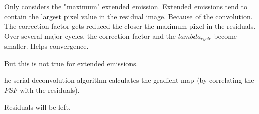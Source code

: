 Only considers the "maximum" extended emission. Extended emissions tend to contain the largest pixel value in the residual image. Because of the convolution.
The correction factor gets reduced the closer the maximum pixel in the residuals. Over several major cycles, the correction factor and the $lambda_{cycle}$ become smaller. 
Helps convergence.


But this is not true for extended emissions.

he serial deconvolution algorithm calculates the gradient map (by correlating the $PSF$ with the residuals).


Residuals will be left. 



